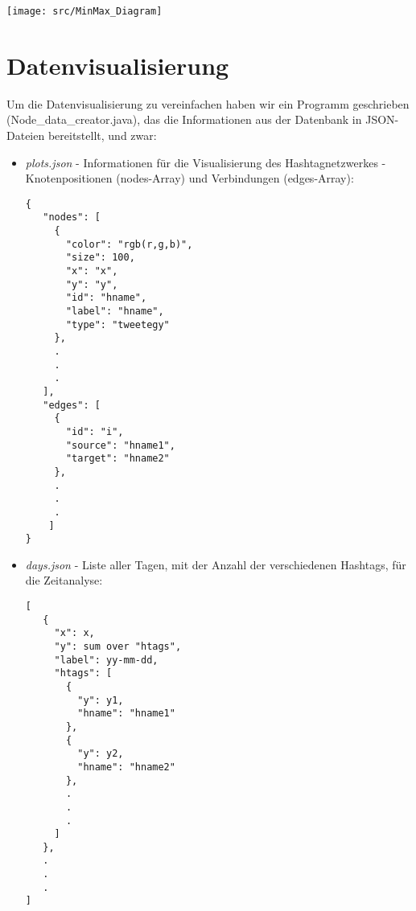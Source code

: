\documentclass[paper=a4, english, ngerman, romanian]{scrartcl}
\begin{document}
		\begin{center}
			\texttt{[image: src/MinMax\_Diagram]}
		\end{center}
		
		\pagebreak

	\section{Datenvisualisierung}
	
		Um die Datenvisualisierung zu vereinfachen haben wir ein Programm geschrieben (Node\_data\_creator.java), das die Informationen aus der Datenbank in JSON-Dateien bereitstellt, und zwar:
			\begin{itemize}
				\item	\textit{plots.json} - Informationen für die Visualisierung des Hashtagnetzwerkes - Knotenpositionen (nodes-Array) und Verbindungen (edges-Array):
				\begin{lstlisting}
{
   "nodes": [
     {
       "color": "rgb(r,g,b)",
       "size": 100,
       "x": "x",
       "y": "y",
       "id": "hname",
       "label": "hname",
       "type": "tweetegy"
     },
     .
     .
     .
   ],
   "edges": [
     {
       "id": "i",
       "source": "hname1",
       "target": "hname2"
     },
     .
     .
     .
    ]
}
				\end{lstlisting}
				
				\item \textit{days.json} - Liste aller Tagen, mit der Anzahl der verschiedenen Hashtags, für die Zeitanalyse:
				
				\begin{lstlisting}
[
   {
     "x": x,
     "y": sum over "htags",
     "label": yy-mm-dd,
     "htags": [
       {
         "y": y1,
         "hname": "hname1"
       },
       {
         "y": y2,
         "hname": "hname2"
       },
       .
       .
       .
     ]
   },
   .
   .
   .
]
				\end{lstlisting}
			\end{itemize}
	
\end{document}
